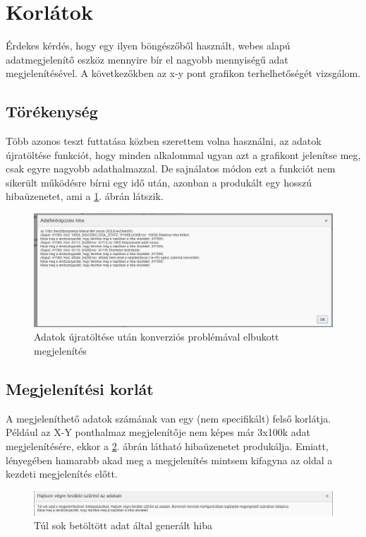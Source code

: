 \section{Korlátok}
	Érdekes kérdés, hogy egy ilyen böngészőből használt, webes alapú adatmegjelenítő eszköz mennyire bír el nagyobb mennyiségű adat megjelenítésével. A következőkben az x-y pont grafikon terhelhetőségét vizsgálom. 
	
	\subsection{Törékenység}
	Több azonos teszt futtatása közben szerettem volna használni, az adatok újratöltése funkciót, hogy minden alkalommal ugyan azt a grafikont jelenítse meg, csak egyre nagyobb adathalmazzal. De sajnálatos módon ezt a funkciót nem sikerült működésre bírni egy idő után, azonban a produkált egy hosszú hibaüzenetet, ami a \ref{fig:hibaorenz}. ábrán látszik.
	\begin{figure}[h!]
		\centering
		\includegraphics[width=1.0\linewidth]{dani_imgs/hiba_orenz}
		\caption{Adatok újratöltése után konverziós problémával elbukott megjelenítés}
		\label{fig:hibaorenz}
	\end{figure}

	\subsection{Megjelenítési korlát}
	A megjeleníthető adatok számának van egy (nem specifikált) felső korlátja. Például az X-Y ponthalmaz megjelenítője nem képes már 3x100k adat megjelenítésére, ekkor a \ref{fig:hiba}. ábrán látható hibaüzenetet produkálja. Emiatt, lényegében hamarabb akad meg a megjelenítés mintsem kifagyna az oldal a kezdeti megjelenítés előtt.
	\begin{figure}[h!]
		\centering
		\includegraphics[width=1.0\linewidth]{dani_imgs/hiba}
		\caption{Túl sok betöltött adat által generált hiba}
		\label{fig:hiba}
	\end{figure}
	
